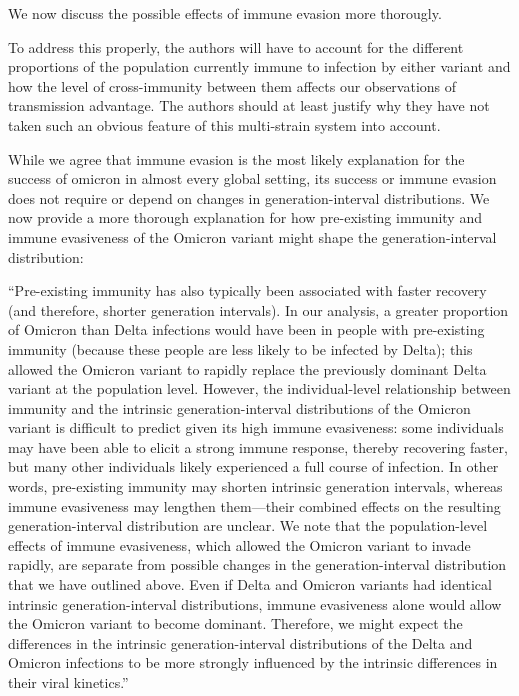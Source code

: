 \documentclass[12pt]{article}
\newcommand{\revtext}{\textsf}
\begin{document}
We now discuss the possible effects of immune evasion more thorougly. 

\revtext{To address this properly, the authors will have to account for the different proportions of the population currently immune to infection by either variant and how the level of cross-immunity between them affects our observations of transmission advantage. The authors should at least justify why they have not taken such an obvious feature of this multi-strain system into account.}

While we agree that immune evasion is the most likely explanation for the success of omicron in almost every global setting, its success or immune evasion does not require or depend on changes in generation-interval distributions.
We now provide a more thorough explanation for how pre-existing immunity and immune evasiveness of the Omicron variant might shape the generation-interval distribution: 

``Pre-existing immunity has also typically been associated with faster recovery \citep{kissler2021viral} (and therefore, shorter generation intervals).
In our analysis, a greater proportion of Omicron than Delta infections would have been in people with pre-existing immunity (because these people are less likely to be infected by Delta);
this allowed the Omicron variant to rapidly replace the previously dominant Delta variant at the population level.
However, the individual-level relationship between immunity and the intrinsic generation-interval distributions of the Omicron variant is difficult to predict given its high immune evasiveness:
some individuals may have been able to elicit a strong immune response, thereby recovering faster, but many other individuals likely experienced a full course of infection.
In other words, pre-existing immunity may shorten intrinsic generation intervals, whereas immune evasiveness may lengthen them---their combined effects on the resulting generation-interval distribution are unclear.
We note that the population-level effects of immune evasiveness, which allowed the Omicron variant to invade rapidly, are separate from possible changes in the generation-interval distribution that we have outlined above.
Even if Delta and Omicron variants had identical intrinsic generation-interval distributions, immune evasiveness alone would allow the Omicron variant to become dominant.
Therefore, we might expect the differences in the intrinsic generation-interval distributions of the Delta and Omicron infections to be more strongly influenced by the intrinsic differences in their viral kinetics.''
\end{document}
